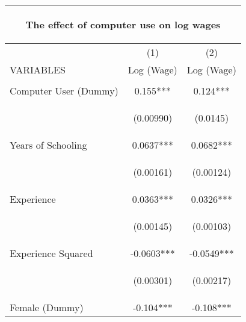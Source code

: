 \begin{center}
\begin{tabular}{lcc}
\multicolumn{3}{c}{\begin{large}The effect of computer use on log wages\label{1e}\end{large}} \\ \hline
 & (1) & (2) \\
VARIABLES & Log (Wage) & Log (Wage) \\ \hline
\vspace{4pt} & \begin{footnotesize}\end{footnotesize} & \begin{footnotesize}\end{footnotesize} \\
Computer User (Dummy) & 0.155*** & 0.124*** \\
\vspace{4pt} & \begin{footnotesize}(0.00990)\end{footnotesize} & \begin{footnotesize}(0.0145)\end{footnotesize} \\
Years of Schooling & 0.0637*** & 0.0682*** \\
\vspace{4pt} & \begin{footnotesize}(0.00161)\end{footnotesize} & \begin{footnotesize}(0.00124)\end{footnotesize} \\
Experience & 0.0363*** & 0.0326*** \\
\vspace{4pt} & \begin{footnotesize}(0.00145)\end{footnotesize} & \begin{footnotesize}(0.00103)\end{footnotesize} \\
Experience Squared & -0.0603*** & -0.0549*** \\
\vspace{4pt} & \begin{footnotesize}(0.00301)\end{footnotesize} & \begin{footnotesize}(0.00217)\end{footnotesize} \\
Female (Dummy) & -0.104*** & -0.108*** \\

\end{tabular}
\end{center}
